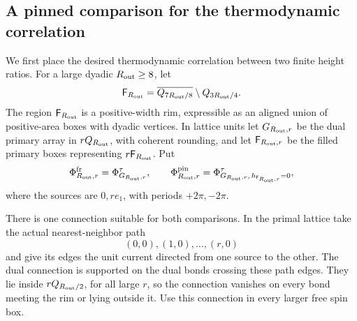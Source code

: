 \subsection{A pinned comparison for the thermodynamic correlation}

We first place the desired thermodynamic correlation between two finite
height ratios.  For a large dyadic \(R_{\rm out}\ge8\), let
\[
 \mathsf F_{R_{\rm out}}
       =\overline{Q_{7R_{\rm out}/8}}\setminus Q_{3R_{\rm out}/4}.
\]
The region \(\mathsf F_{R_{\rm out}}\) is a positive-width rim, expressible as an
aligned union of positive-area boxes with dyadic vertices.  In lattice units let
\(G_{R_{\rm out},r}\) be the dual primary array in \(rQ_{R_{\rm out}}\), with coherent
rounding, and let \(\mathsf F_{R_{\rm out},r}\) be the filled primary boxes
representing \(r\mathsf F_{R_{\rm out}}\).  Put
\[
 \Phi_{R_{\rm out},r}^{\rm fr}=\Phi_{G_{R_{\rm out},r}}^\tau,
 \qquad
 \Phi_{R_{\rm out},r}^{\rm pin}
     =\Phi_{G_{R_{\rm out},r},\,h_{\mathsf F_{R_{\rm out},r}}=0}^\tau,
\]
where the sources are \(0,re_1\), with periods \(+2\pi,-2\pi\).

There is one connection suitable for both comparisons.  In the primal
lattice take the actual nearest-neighbor path
\[
 (0,0),(1,0),\ldots,(r,0)
\]
and give its edges the unit current directed from one source to the
other.  The dual connection is supported on the dual bonds crossing
these path edges.  They lie inside \(rQ_{R_{\rm out}/2}\), for all large \(r\),
so the connection vanishes on every bond meeting the rim or lying
outside it.  Use this connection in every larger free spin box.

